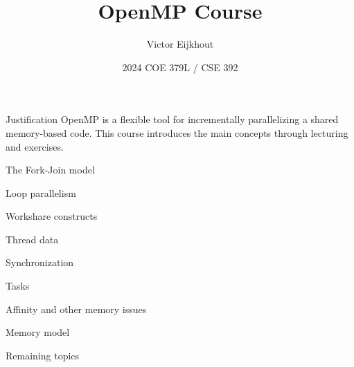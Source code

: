 \documentclass[10pt]{beamer}
\begin{document}
\author[Eijkhout]{Victor Eijkhout}
\date[2024]{2024 COE 379L / CSE 392}
\title[OMP]{OpenMP Course}
\maketitle

\begin{frame}{Justification}
  OpenMP is a flexible tool for incrementally parallelizing a shared
  memory-based code.
  This course introduces the main concepts
  through lecturing and exercises.
\end{frame}

 {The Fork-Join model}


 {Loop parallelism}


 {Workshare constructs}


 {Thread data}


 {Synchronization}


 {Tasks}


 {Affinity and other memory issues}


 {Memory model}


 {Remaining topics}

\end{document}
